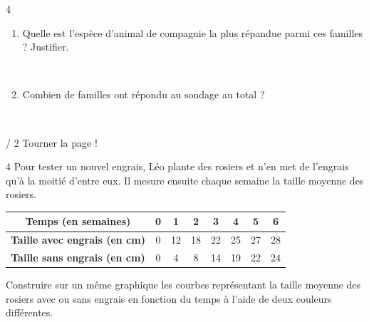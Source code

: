 \documentclass[a4paper]{book}
\begin{document}
{\begin{exerciceNote}{4}
\begin{minipage}{0.55\linewidth}
\begin{enumerate}
                \points[17] \\ \points[17]

                \item Quelle est l'espèce d'animal de compagnie la plus répandue parmi ces familles ? Justifier.

                \points[17] \\ \points[17]

                \item Combien de familles ont répondu au sondage au total ?

                \points[17] \\ \points[17]
            \end{enumerate}
        \end{minipage}
    \end{exerciceNote}


    \vfill
    \thepage / 2 \hfill Tourner la page !
\newpage


    \begin{exerciceNote}{4}
        Pour tester un nouvel engrais, Léo plante des rosiers et n'en met de l'engrais qu'à la moitié d'entre eux. Il mesure ensuite chaque semaine la taille moyenne des rosiers.
        
        \begin{center}
            \begin{tabular}{|c|c|c|c|c|c|c|c|}
                \hline
                \textbf{Temps (en semaines)} & \textbf{0} & \textbf{1} & \textbf{2} & \textbf{3} & \textbf{4} & \textbf{5} & \textbf{6} \\
                \hline
                \textbf{Taille avec engrais (en cm)} & 0 & 12 & 18 & 22 & 25 & 27 & 28 \\
                \hline
                \textbf{Taille sans engrais (en cm)} & 0 & 4 & 8 & 14 & 19 & 22 & 24 \\
                \hline
            \end{tabular}
        \end{center}

        \begin{minipage}{0.5\linewidth}
            Construire sur un même graphique les courbes représentant la taille moyenne des rosiers avec ou sans engrais en fonction du temps à l'aide de deux couleurs différentes. 
        \end{minipage}
        \hfill
        \begin{minipage}{0.49\linewidth}
            \begin{center}
            \end{center}
        \end{minipage}  
    \end{exerciceNote}


}
\end{document}
